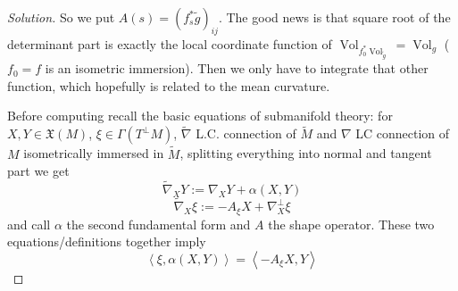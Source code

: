 \begin{proof}[Solution]
So we put \(A(s)=(f^*_s\tilde{g})_{ij}\). The good news is that square root of the determinant part is exactly the local coordinate function of \(\operatorname{Vol}_{f_0^*\operatorname{Vol}_{\tilde{g}}}=\operatorname{Vol}_g\) (\(f_0=f\) is an isometric immersion). Then we only have to integrate that other function, which hopefully is related to the mean curvature.

Before computing recall the basic equations of submanifold theory: for \(X,Y \in \mathfrak{X}(M)\), \(\xi \in \Gamma(T^\perp M)\), \(\tilde{\nabla}\) L.C. connection of \(\tilde{M}\) and \(\nabla\) LC connection of \(M\) isometrically immersed in  \(\tilde{M}\), splitting everything into normal and tangent part we get
\[\boxed{\tilde{\nabla}_XY:=\nabla_XY+\alpha(X,Y)}\]
\[\boxed{\tilde{\nabla}_X\xi:=-A_\xi X+\nabla^\perp_X\xi}\]
and call \(\alpha\) the second fundamental form and \(A\) the shape operator. These two equations/definitions together imply
\[\boxed{\left<\xi,\alpha(X,Y)\right>=\left<-A_\xi X,Y\right>}\]



\end{proof}
